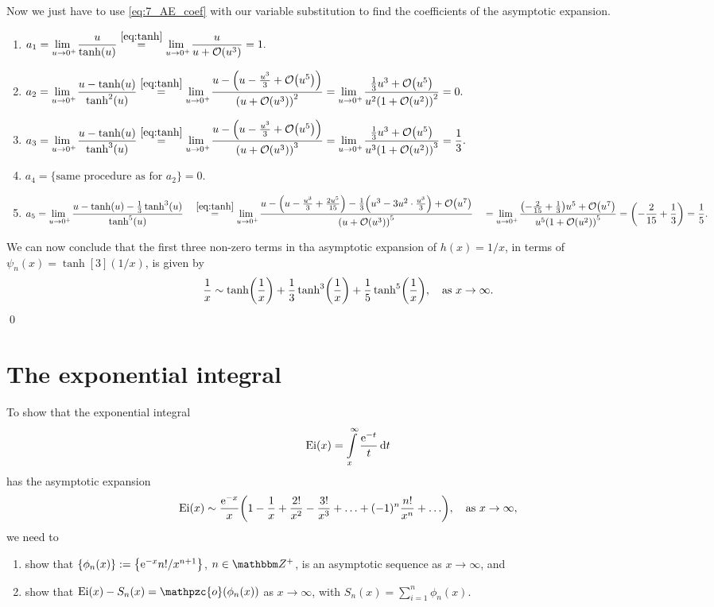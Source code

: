 \documentclass[11pt,letter, swedish, english
]{article}
\newcommand{\oh}{\ensuremath\mathpzc{o}}
\newcommand{\Ei}{\ensuremath\mathrm{Ei}}
\begin{document}
Now we just have to use \eqref{eq:7_AE_coef} with our variable
substitution to find the coefficients of the asymptotic expansion.
\begin{enumerate}
\item $\displaystyle a_1=\limu\frac{u}{\tanh(u)}
\stackrel{\eqref{eq:tanh}}{=}\limu \frac{u}{u+\order{u^3}} = 1.
$
\item $\displaystyle a_2=\limu\frac{u-\tanh(u)}{\tanh^2(u)}
\stackrel{\eqref{eq:tanh}}{=}\limu 
\frac{u-\qty(u-\frac{u^3}{3} + \order{u^5})}{\qty(u+\order{u^3})^2} 
=\limu 
\frac{\frac{1}{3}u^3 + \order{u^5}}{u^2\qty(1+\order{u^2})^2}= 0.
$
\item $\displaystyle a_3=\limu\frac{u-\tanh(u)}{\tanh^3(u)}
\stackrel{\eqref{eq:tanh}}{=}\limu 
\frac{u-\qty(u-\frac{u^3}{3} + \order{u^5})}{\qty(u+\order{u^3})^3} 
=\limu 
\frac{\frac{1}{3}u^3 + \order{u^5}}{u^3\qty(1+\order{u^2})^3}= \frac{1}{3}.
$
\item $\displaystyle a_4=
\Big\{\text{same procedure as for }a_2\Big\}= 0.
$
\item $\displaystyle a_5=\limu\frac{u-\tanh(u)-\frac{1}{3}\tanh^3(u)}{\tanh^5(u)}
\\\phantom{a_5}\stackrel{\eqref{eq:tanh}}{=}\limu 
\frac{u-\qty(u - \frac{u^3}{3} + \frac{2u^5}{15})
        -\frac{1}{3}\qty(u^3 - 3u^2\cdot\frac{u^3}{3}) +\order{u^7}}
     {\qty(u+\order{u^3})^5} 
\\\phantom{a_5}
=\limu 
\frac{\qty(-\frac{2}{15}+\frac{1}{3})u^5 + \order{u^7}}
     {u^5\qty(1+\order{u^2})^5}
= \qty(-\frac{2}{15}+\frac{1}{3}) = \frac{1}{5}.
$
\end{enumerate}
We can now conclude that the first three non-zero terms in tha
asymptotic expansion of $h(x)=1/x$, in terms of
$\psi_n(x)=\tanh[3](1/x)$, is given by
\begin{equation}
\frac{1}{x} \sim \tanh(\frac{1}{x}) 
+ \frac{1}{3}\tanh[3](\frac{1}{x})
+ \frac{1}{5}\tanh[5](\frac{1}{x}) \as x\to\infty.
\end{equation}
\qed





\section{The exponential integral}
To show that the exponential integral
\begin{equation}
\Ei(x)=\int_x^\infty \frac{\ee^{-t}}{t}\id{t}
\end{equation}
has the asymptotic expansion
\begin{equation}\label{eq:8_Ei_AE}
\Ei(x) \sim \frac{\ee^{-x}}{x}
\qty(1-\frac{1}{x}+\frac{2!}{x^2}-\frac{3!}{x^3}+\ldots+(-1)^n\frac{n!}{x^n}+\ldots)
\as x\to\infty,
\end{equation}
we need to
\begin{enumerate}[label=(\roman*)]
\item show that $\{\phi_n(x)\}:=\qty{\mathrm{e}^{-x}n!/x^{n+1}}$, $n\in\Z^+$, is an
asymptotic sequence as $x\to\infty$, and
\item show that $\Ei(x)-S_n(x)=\oh(\phi_n(x))$ as $x\to\infty$, with
$S_n(x)=\sum_{i=1}^n\phi_n(x)$. 
\end{enumerate}
\end{document}
